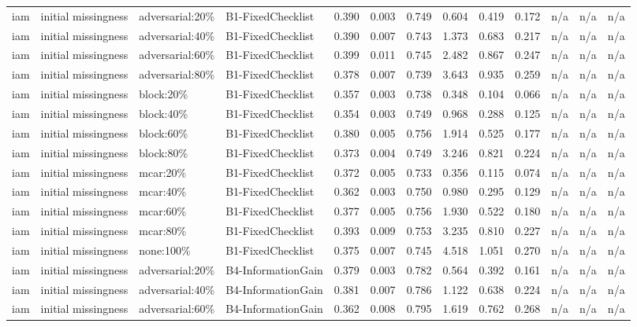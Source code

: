 \begin{table}[!ht]
{\begin{tabular}{lllllllllllll}
iam & initial missingness & adversarial:20\% & B1-FixedChecklist & 0.390 & 0.003 & 0.749 & 0.604 & 0.419 & 0.172 & n/a & n/a & n/a \\
iam & initial missingness & adversarial:40\% & B1-FixedChecklist & 0.390 & 0.007 & 0.743 & 1.373 & 0.683 & 0.217 & n/a & n/a & n/a \\
iam & initial missingness & adversarial:60\% & B1-FixedChecklist & 0.399 & 0.011 & 0.745 & 2.482 & 0.867 & 0.247 & n/a & n/a & n/a \\
iam & initial missingness & adversarial:80\% & B1-FixedChecklist & 0.378 & 0.007 & 0.739 & 3.643 & 0.935 & 0.259 & n/a & n/a & n/a \\
iam & initial missingness & block:20\% & B1-FixedChecklist & 0.357 & 0.003 & 0.738 & 0.348 & 0.104 & 0.066 & n/a & n/a & n/a \\
iam & initial missingness & block:40\% & B1-FixedChecklist & 0.354 & 0.003 & 0.749 & 0.968 & 0.288 & 0.125 & n/a & n/a & n/a \\
iam & initial missingness & block:60\% & B1-FixedChecklist & 0.380 & 0.005 & 0.756 & 1.914 & 0.525 & 0.177 & n/a & n/a & n/a \\
iam & initial missingness & block:80\% & B1-FixedChecklist & 0.373 & 0.004 & 0.749 & 3.246 & 0.821 & 0.224 & n/a & n/a & n/a \\
iam & initial missingness & mcar:20\% & B1-FixedChecklist & 0.372 & 0.005 & 0.733 & 0.356 & 0.115 & 0.074 & n/a & n/a & n/a \\
iam & initial missingness & mcar:40\% & B1-FixedChecklist & 0.362 & 0.003 & 0.750 & 0.980 & 0.295 & 0.129 & n/a & n/a & n/a \\
iam & initial missingness & mcar:60\% & B1-FixedChecklist & 0.377 & 0.005 & 0.756 & 1.930 & 0.522 & 0.180 & n/a & n/a & n/a \\
iam & initial missingness & mcar:80\% & B1-FixedChecklist & 0.393 & 0.009 & 0.753 & 3.235 & 0.810 & 0.227 & n/a & n/a & n/a \\
iam & initial missingness & none:100\% & B1-FixedChecklist & 0.375 & 0.007 & 0.745 & 4.518 & 1.051 & 0.270 & n/a & n/a & n/a \\
iam & initial missingness & adversarial:20\% & B4-InformationGain & 0.379 & 0.003 & 0.782 & 0.564 & 0.392 & 0.161 & n/a & n/a & n/a \\
iam & initial missingness & adversarial:40\% & B4-InformationGain & 0.381 & 0.007 & 0.786 & 1.122 & 0.638 & 0.224 & n/a & n/a & n/a \\
iam & initial missingness & adversarial:60\% & B4-InformationGain & 0.362 & 0.008 & 0.795 & 1.619 & 0.762 & 0.268 & n/a & n/a & n/a \\

\end{tabular}}
\end{table}
